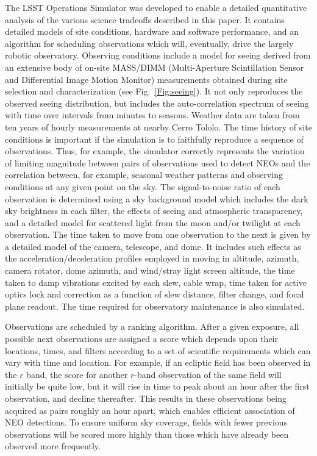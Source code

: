 \documentclass{emulateapj}
\begin{document}
{The LSST Operations Simulator was developed to enable a 
detailed quantitative analysis of the various science tradeoffs described in 
this paper. It contains detailed models of site conditions, hardware and
software performance, and an algorithm for scheduling observations which will, 
eventually, drive the largely robotic observatory. 
Observing conditions include a model for seeing derived from an extensive body
of on-site MASS/DIMM (Multi-Aperture Scintillation Sensor and Differential
Image Motion Monitor) measurements obtained during site selection and
characterization (see Fig.~\ref{Fig:seeing}). It not only reproduces the 
observed seeing distribution, but includes 
the auto-correlation spectrum of seeing with time over intervals from minutes 
to seasons. Weather data are taken from ten years of hourly measurements at
nearby Cerro Tololo. The time history of site conditions is important if the 
simulation is to faithfully reproduce a sequence of observations. Thus, for
example, the simulator correctly represents the variation of limiting
magnitude between pairs of observations used to detect NEOs and the
correlation between, for example, seasonal weather patterns and observing
conditions at any given point on the sky. The signal-to-noise ratio of each 
observation is determined using a sky background model which includes the dark
sky brightness in each filter, the effects of seeing and atmospheric
transparency, and a detailed model for scattered light from the moon and/or 
twilight at each observation. The time taken to move from one observation to
the next is given by a detailed model of the camera, telescope, and dome. It 
includes such effects as the acceleration/deceleration profiles employed in 
moving in altitude, azimuth, camera rotator, dome azimuth, and wind/stray
light screen altitude, the time taken to damp vibrations excited by each slew, 
cable wrap, time taken for active optics lock and correction as a function of 
slew distance, filter change, and focal plane readout. The time required for
observatory maintenance is also simulated. 

Observations are scheduled by a ranking algorithm. After a given exposure, all 
possible next observations are assigned a score which depends upon their locations, times,
and filters according to a set of scientific requirements which can vary with 
time and location. For example, if an ecliptic field has been observed in the
$r$ band, the score for another $r$-band observation of the same field will 
initially be quite low, but it will rise in time to peak about an hour after
the first observation, and decline thereafter. This results in these
observations being acquired as pairs roughly an hour apart, which enables
efficient association of NEO detections. To ensure uniform 
sky coverage, fields with fewer previous observations will be scored more
highly than those which have already been observed more frequently.
 
}
\end{document}
